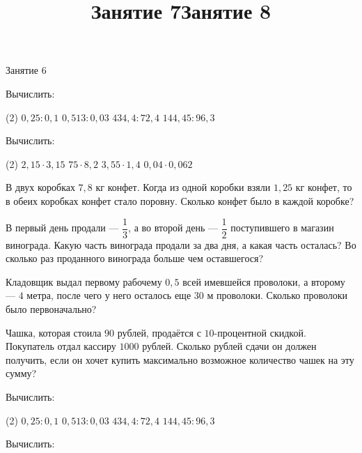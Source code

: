 \begin{class}[number=6]
	\begin{listofex}
		\item Занятие 6
	\end{listofex}
\end{class}

\begin{class}[number=7-8]
	\title{Занятие 7}
	\begin{listofex}
		\item Вычислить:
		\begin{tasks}(2)
			\task \( 0,25: 0,1 \)
			\task \( 0,513:0,03 \)
			\task \( 434,4:72,4 \)
			\task \( 144,45:96,3 \)
		\end{tasks}
		\item Вычислить:
		\begin{tasks}(2)
			\task \( 2,15\cdot3,15 \)
			\task \( 75\cdot8,2 \)
			\task \( 3,55\cdot1,4 \)
			\task \( 0,04\cdot0,062 \)
		\end{tasks}
		\item В двух коробках \(7,8\) кг конфет. Когда из одной коробки взяли \(1,25\) кг конфет, то в обеих коробках конфет стало поровну. Сколько конфет было в каждой коробке?
		\item В первый день продали --- \(\dfrac{1}{3}\), а во второй день --- \(\dfrac{1}{2}\) поступившего в магазин винограда. Какую часть винограда продали за два дня, а какая часть осталась? Во сколько раз проданного винограда больше чем оставшегося?
		\item Кладовщик выдал первому рабочему \(0,5\) всей имевшейся проволоки, а второму --- \(4\) метра, после чего у него осталось еще \(30\) м проволоки. Сколько проволоки было первоначально?
		\item Чашка, которая стоила \(90\) рублей, продаётся с \(10\)-процентной скидкой. Покупатель отдал кассиру \(1000\) рублей. Сколько рублей сдачи он должен получить, если он хочет купить максимально возможное количество чашек на эту сумму?
	\end{listofex}
	\newpage
	\title{Занятие 8}
	\begin{listofex}
		\item Вычислить:
		\begin{tasks}(2)
			\task \( 0,25: 0,1 \)
			\task \( 0,513:0,03 \)
			\task \( 434,4:72,4 \)
			\task \( 144,45:96,3 \)
		\end{tasks}
		\item Вычислить:

\end{listofex}
\end{class}
